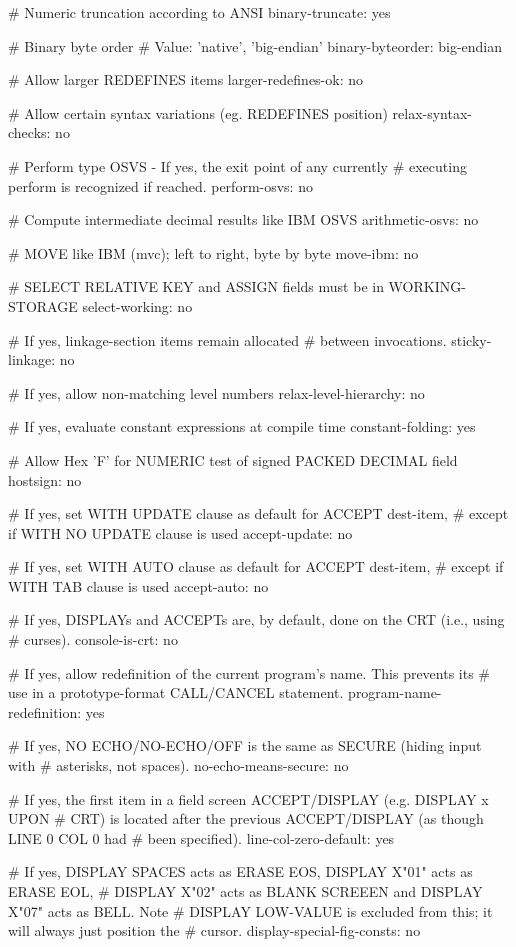 # Numeric truncation according to ANSI
binary-truncate:		yes

# Binary byte order
# Value: 'native', 'big-endian'
binary-byteorder:		big-endian

# Allow larger REDEFINES items
larger-redefines-ok:		no

# Allow certain syntax variations (eg. REDEFINES position)
relax-syntax-checks:		no

# Perform type OSVS - If yes, the exit point of any currently
# executing perform is recognized if reached.
perform-osvs:			no

# Compute intermediate decimal results like IBM OSVS
arithmetic-osvs:		no

# MOVE like IBM (mvc); left to right, byte by byte
move-ibm:			no

# SELECT RELATIVE KEY and ASSIGN fields must be in WORKING-STORAGE
select-working:		no

# If yes, linkage-section items remain allocated
# between invocations.
sticky-linkage:			no

# If yes, allow non-matching level numbers
relax-level-hierarchy:		no

# If yes, evaluate constant expressions at compile time
constant-folding:		yes

# Allow Hex 'F' for NUMERIC test of signed PACKED DECIMAL field
hostsign:			no

# If yes, set WITH UPDATE clause as default for ACCEPT dest-item,
# except if WITH NO UPDATE clause is used
accept-update:			no

# If yes, set WITH AUTO clause as default for ACCEPT dest-item,
# except if WITH TAB clause is used
accept-auto:			no

# If yes, DISPLAYs and ACCEPTs are, by default, done on the CRT (i.e., using
# curses).
console-is-crt:			no

# If yes, allow redefinition of the current program's name. This prevents its
# use in a prototype-format CALL/CANCEL statement.
program-name-redefinition:	yes

# If yes, NO ECHO/NO-ECHO/OFF is the same as SECURE (hiding input with
# asterisks, not spaces).
no-echo-means-secure:		no

# If yes, the first item in a field screen ACCEPT/DISPLAY (e.g. DISPLAY x UPON
# CRT) is located after the previous ACCEPT/DISPLAY (as though LINE 0 COL 0 had
# been specified).
line-col-zero-default:		yes

# If yes, DISPLAY SPACES acts as ERASE EOS, DISPLAY X"01" acts as ERASE EOL,
# DISPLAY X"02" acts as BLANK SCREEEN and DISPLAY X"07" acts as BELL. Note
# DISPLAY LOW-VALUE is excluded from this; it will always just position the
# cursor.
display-special-fig-consts:	no

